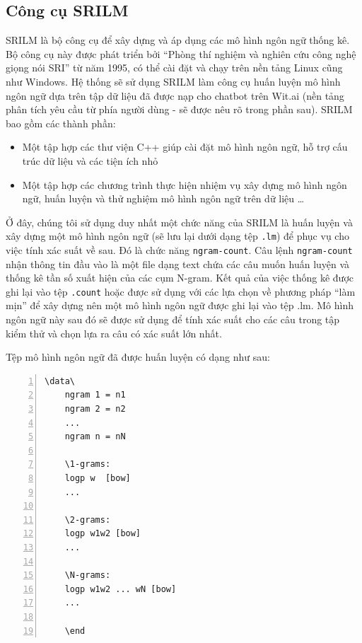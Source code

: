 \documentclass[12pt]{report}
\begin{document}
\subsection{Công cụ SRILM}
SRILM là bộ công cụ để xây dựng và áp dụng các mô hình ngôn ngữ thống kê. Bộ công cụ này được phát triển bởi “Phòng thí nghiệm và nghiên cứu công nghệ giọng nói SRI” từ năm 1995, có thể cài đặt và chạy trên nền tảng Linux cũng như Windows.
Hệ thống sẽ sử dụng SRILM làm công cụ huấn luyện mô hình ngôn ngữ dựa trên tập dữ liệu đã được nạp cho chatbot trên Wit.ai (nền tảng phân tích yêu cầu từ phía người dùng - sẽ được nêu rõ trong phần sau). SRILM bao gồm các thành phần:

\begin{itemize}
	\item Một tập hợp các thư viện C++ giúp cài đặt mô hình ngôn ngữ, hỗ trợ cấu trúc dữ liệu và các tiện ích nhỏ
	\item Một tập hợp các chương trình thực hiện nhiệm vụ xây dựng mô hình ngôn ngữ, huấn luyện và thử nghiệm mô hình ngôn ngữ trên dữ liệu \ldots
\end{itemize}

Ở đây, chúng tôi sử dụng duy nhất một chức năng của SRILM là huấn luyện và xây dựng một mô hình ngôn ngữ (sẽ lưu lại dưới dạng tệp \texttt{.lm}) để phục vụ cho việc tính xác suất về sau. Đó là chức năng \texttt{ngram-count}. Câu lệnh \texttt{ngram-count} nhận thông tin đầu vào là một file dạng text chứa các câu muốn huấn luyện và thống kê tần số xuất hiện của các cụm N-gram. Kết quả của việc thống kê được ghi lại vào tệp \texttt{.count} hoặc được sử dụng với các lựa chọn về phương pháp ``làm mịn'' để xây dựng nên một mô hình ngôn ngữ được ghi lại vào tệp .lm. Mô hình ngôn ngữ này sau đó sẽ được sử dụng để tính xác suất cho các câu trong tập kiểm thử và chọn lựa ra câu có xác suất lớn nhất.

Tệp mô hình ngôn ngữ đã được huấn luyện có dạng như sau:
\begin{lstlisting}[frame=lines, basicstyle=\footnotesize\ttfamily, numbers=left, numberstyle=\tiny\color{black},caption= {Cấu trúc một mô hình ngôn ngữ}, backgroundcolor=\color{background}]
	\data\
	ngram 1 = n1
	ngram 2 = n2
	...
	ngram n = nN

	\1-grams:
	logp w  [bow]
	...

	\2-grams:
	logp w1w2 [bow]
	...

	\N-grams:
	logp w1w2 ... wN [bow]
	...

	\end
\end{lstlisting}
		
\end{document}
